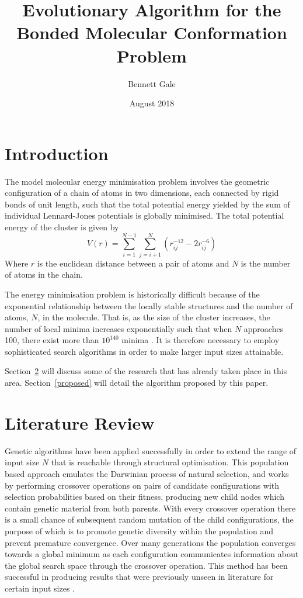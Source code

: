 \documentclass{article}
\title{Evolutionary Algorithm for the Bonded Molecular Conformation Problem}
\author{Bennett Gale}
\date{August 2018}
\begin{document}
\maketitle

\section{Introduction}

The model molecular energy minimisation problem involves the geometric
configuration of a chain of atoms in two dimensions, each connected by rigid
bonds of unit length, such that the total potential energy yielded by the sum of
individual Lennard-Jones potentials is globally minimised. The total potential
energy of the cluster is given by
$$V(r)=\sum^{N-1}_{i=1}\sum^{N}_{j=i+1}\left(r^{-12}_{ij}-2r^{-6}_{ij}\right)$$
Where $r$ is the euclidean distance between a pair of atoms and $N$ is the
number of atoms in the chain.

The energy minimisation problem is historically difficult because of the
exponential relationship between the locally stable structures and the number of
atoms, $N$, in the molecule. That is, as the size of the cluster increases, the
number of local minima increases exponentially such that when $N$ approaches
100, there exist more than $10^{140}$ minima \cite{DAVEN1996195}. It is
therefore necessary to employ sophisticated search algorithms in order to make
larger input sizes attainable.

Section~\ref{litreview} will discuss some of the research that has already taken
place in this area. Section~\ref{proposed} will detail the algorithm proposed by
this paper.

\section{Literature Review} \label{litreview}

Genetic algorithms have been applied \cite{doi:10.1002/qua.560440214,
PULLAN1998331, } successfully in order to extend the range of input size $N$
that is reachable through structural optimisation. This population based
approach emulates the Darwinian process of natural selection, and works by
performing crossover operations on pairs of candidate configurations with
selection probabilities based on their fitness, producing new child nodes which
contain genetic material from both parents. With every crossover operation there
is a small chance of subsequent random mutation of the child configurations, the
purpose of which is to promote genetic diversity within the population and
prevent premature convergence. Over many generations the population converges
towards a global minimum as each configuration communicates information about
the global search space through the crossover operation. This method has been
successful in producing results that were previously unseen in literature for
certain input sizes \cite{PULLAN1998331}.
\end{document}
